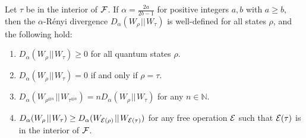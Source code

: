 \documentclass[
twocolumn,
superscriptaddress
]{revtex4-1}
\newenvironment{customthm}[1]
  {\renewcommand\theinnercustomthm{#1}\innercustomthm}
  {\endinnercustomthm}
\def\E{{\cal E}}
\def\F{{\cal F}}
\begin{document}
\begin{customthm}{11}\label{thm:Da_props}
	Let $\tau$ be in the interior of $\F$. 
	If $\alpha = \frac{2a}{2b-1}$ for positive integers $a,b$ with $a \geq b$, then the $\alpha$-R\'{e}nyi divergence $D_\alpha(W_\rho \hspace{1pt}||\hspace{1pt} W_\tau)$ is well-defined for all states $\rho$, and the following hold:
\begin{enumerate}
\item $D_\alpha(W_\rho \hspace{1pt}||\hspace{1pt} W_\tau) \ge 0$ for all quantum states $\rho$.
\item  $D_\alpha(W_\rho \hspace{1pt}||\hspace{1pt} W_\tau) = 0$ if and only if $\rho =\tau$.
\item $D_\alpha(W_{\rho^{\otimes n}} \hspace{1pt}||\hspace{1pt} W_{\tau^{\otimes n}}) = n D_\alpha(W_\rho \hspace{1pt}||\hspace{1pt} W_\tau)$ for any $n \in \mathbb{N}$.
\item $D_\alpha(W_\rho \hspace{1pt}||\hspace{1pt} W_\tau) \geq D_\alpha (W_{\E(\rho)} \hspace{1pt}||\hspace{1pt} W_{\E(\tau)})$ for any free operation $\E$ such that $\E(\tau)$ is in the interior of $\F$.
\end{enumerate}
\end{customthm}
\end{document}
